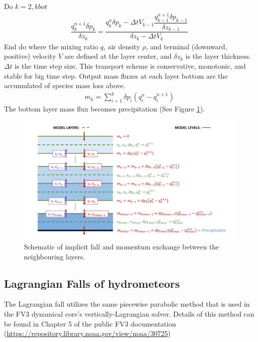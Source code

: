 \documentclass[letterpaper,titlepage,10pt]{article}
\numberwithin{equation}{section}
\begin{document}
Do $k = 2, kbot$
\begin{gather}
	\dfrac{q^{n+1}_k \delta p_k}{\delta z_k} = \dfrac{q^n_k \delta p_k - \Delta t V_{k-1} \dfrac{q^{n+1}_{k-1} \delta p_{k-1}}{\delta z_{k-1}}}{\delta z_k - \Delta t V_k}
\end{gather}
End do
where the mixing ratio $q$, air density $\rho$, and terminal (downward, positive) velocity $V$ are defined at the layer center, and $\delta z_k$ is the layer thickness. $\Delta t$ is the time step size. This transport scheme is conservative, monotonic, and stable for big time step. Output mass fluxes at each layer bottom are the accumulated of species mass loss above.
\begin{gather}
	m_k = \sum_{i = 1}^k \delta p_i \left(q^{n}_{i} - q^{n+1}_{i} \right)
\end{gather}
The bottom layer mass flux becomes precipitation (See Figure \ref{fig:fig4}).

\begin{figure}[h]
\centering
\includegraphics[width=\textwidth]{fig4.pdf}
\caption{Schematic of implicit fall and momentum exchange between the neighbouring layers.}
\label{fig:fig4}
\end{figure}


\subsection{Lagrangian Falls of hydrometeors}

The Lagrangian fall utilizes the same piecewise parabolic method that is used in the FV3 dynamical core's vertically-Lagrangian solver. Details of this method can be found in Chapter 5 of the public FV3 documentation (\url{https://repository.library.noaa.gov/view/noaa/30725}) \citep{harris2021asci}
\end{document}
